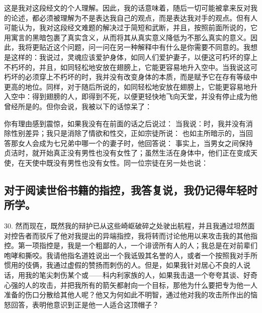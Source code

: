 这是我对这段经文的个人理解。因此，我的话意味着，随后一切可能被拿来反对我的论述，都必须被理解为不是表达我自己的观点，而是表达我对手的观点。但有人可能认为，我对这段经文难题的解决过于简短和武断，并且，按照前面所说的，它用寓言的黑暗包裹了真实含义，从而将其从真实意义降低为不那么真实的意义。因此，我将更贴近这个问题，问一问在另一种解释中有什么是你需要不同意的。我想是这样的：我说过，灵魂应该爱护身体，如同人们爱护妻子，以便这可朽坏的穿上不朽坏的，并且，如同轻松地安放在翅膀上，它能更容易地升入空中。当我说这可朽坏的必须穿上不朽坏的时，我并没有改变身体的本质，而是赋予它在存有等级中更高的地位。同样，对于随后所说的，如同轻松地安放在翅膀上，它能更容易地升入空中：得到翅膀的人，即得到不死，以便更轻快地飞向天堂，并没有停止成为他曾经所是的。但你会说，我被以下的话惊呆了：\par

\par

你有理由感到震惊，如果我没有在前面的话之后说过： 当我说：时，我并没有消除性别差异；我只是消除了情欲和性交，正如宗徒所说： 也如主所暗示的，当回答那女人会成为七兄弟中哪一个的妻子时，他回答说： 事实上，当男女之间保持贞洁时，就开始真正没有男性也没有女性了；虽然生活在身体中，他们正在变成天使，在天使中既没有男性也没有女性。同一位宗徒在另一处也说：\par


\subsection{对于阅读世俗书籍的指控，我答复说，我仍记得年轻时所学。}

30. 然而现在，既然我的辩护已从这些崎岖破碎之处驶出航程，并且我通过坦然面对控告者而驳斥了他对我提出的异端指控，我将转而讨论他用以来攻击我的其他指控。第一项指控是，我是一个粗鄙的人，一个诽谤所有人的人；我总是在对前辈们咆哮和撕咬。我请他指名道姓说出一个我诋毁其名誉的人，或者一个按照我对手所惯用的伎俩，我通过虚假的赞扬而刺伤的人。但是，如果我针对居心不良的人说话，用我的笔尖刺伤某个或——科内利家族的人，如果我击退一个夸夸其谈、好奇心强的人的攻击，并把我所有的箭矢都射向一个目标，那他为什么要把专为他一人准备的伤口分散给其他人呢？他又为何如此不明智，通过他对我的攻击所作出的恼怒回答，表明他意识到正是他一人适合这顶帽子？\par

